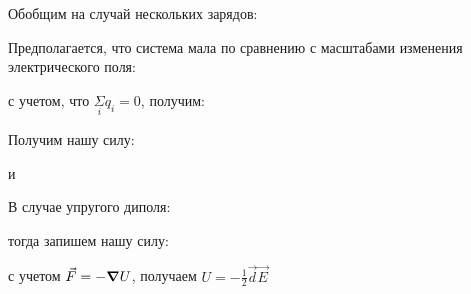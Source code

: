 Обобщим на случай нескольких зарядов:


Предполагается, что система мала по сравнению с масштабами изменения электрического поля:


с учетом, что $\underset{i}{\Sigma}q_i=0$, получим:


Получим нашу силу:


и 


В случае упругого диполя:


тогда запишем нашу силу:


с учетом $\vec{F}=-\grad U$, получаем $U=-\frac{1}{2}\vec{d}\vec{E}$
